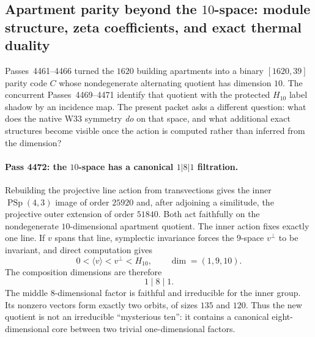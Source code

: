 \subsection{Apartment parity beyond the $10$-space: module structure, zeta coefficients, and exact thermal duality}
\label{sec:pass4472-4479-apartment-module}

Passes~4461--4466 turned the $1620$ building apartments into a binary
$[1620,39]$ parity code $C$ whose nondegenerate alternating quotient has
dimension $10$.  The concurrent Passes~4469--4471 identify that quotient with
the protected $H_{10}$ label shadow by an incidence map.  The present packet
asks a different question: what does the native W33 symmetry \emph{do} on that
space, and what additional exact structures become visible once the action is
computed rather than inferred from the dimension?

\paragraph{Pass 4472: the $10$-space has a canonical $1|8|1$ filtration.}
Rebuilding the projective line action from transvections gives the inner
$\operatorname{PSp}(4,3)$ image of order $25920$ and, after adjoining a
similitude, the projective outer extension of order $51840$.  Both act
faithfully on the nondegenerate $10$-dimensional apartment quotient.  The inner
action fixes exactly one line.  If $v$ spans that line, symplectic invariance
forces the $9$-space $v^\perp$ to be invariant, and direct computation gives
\begin{equation}
  0 < \langle v\rangle < v^\perp < H_{10},
  \qquad
  \dim=(1,9,10).
  \label{eq:pass4472-filtration}
\end{equation}
The composition dimensions are therefore
\begin{equation}
  \boxed{1\mid 8\mid 1.}
  \label{eq:pass4472-181}
\end{equation}
The middle $8$-dimensional factor is faithful and irreducible for the inner
group.  Its nonzero vectors form exactly two orbits, of sizes $135$ and $120$.
Thus the new quotient is not an irreducible ``mysterious ten'': it contains a
canonical eight-dimensional core between two trivial one-dimensional factors.


